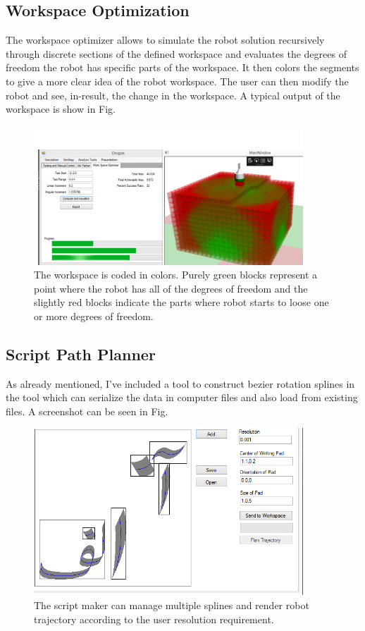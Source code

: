 {    \subsection{Workspace Optimization}
    The workspace optimizer allows to simulate the robot solution recursively through discrete sections of the defined workspace and evaluates the degrees of freedom the robot has  specific parts of the workspace. It then colors the segments to give a more clear idea of the robot workspace. The user can then modify the robot and see, in-result, the change in the workspace. A typical output of the workspace is show in Fig.

        \begin{figure}
          \centering
          \includegraphics[width=0.9\textwidth]{../Images/WorkSpaceOptimer.png}
          \caption{The workspace is coded in colors. Purely green blocks represent a point where the robot has all of the degrees of freedom and the slightly red blocks indicate the parts where robot starts to loose one or more degrees of freedom.
          } \label{FigWorkspace}
        \end{figure}
    \subsection{Script Path Planner}
    As already mentioned, I've included a tool to construct bezier rotation splines in the tool which can serialize the data in computer files and also load from existing files. A screenshot can be seen in Fig.

        \begin{figure}
          \centering
          \includegraphics[width=0.9\textwidth]{../Images/SctiptEditor.png}
          \caption{The script maker can manage multiple splines and render robot trajectory according to the user resolution requirement.
          } \label{FigWorkspace}
        \end{figure}
}
